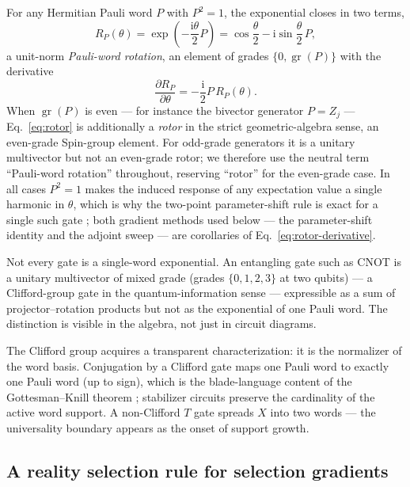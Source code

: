\documentclass[11pt]{article}
\newcommand{\ii}{\mathrm{i}}
\begin{document}
For any Hermitian Pauli word $P$ with $P^2=1$, the exponential closes in two terms,
\begin{equation}
    R_P(\theta)=\exp\!\left(-\frac{\ii\theta}{2}P\right)
    =\cos\frac{\theta}{2}-\ii\sin\frac{\theta}{2}\,P,
    \label{eq:rotor}
\end{equation}
a unit-norm \emph{Pauli-word rotation}, an element of grades $\{0,\operatorname{gr}(P)\}$ with the derivative
\begin{equation}
    \frac{\partial R_P}{\partial\theta}= -\frac{\ii}{2}P\, R_P(\theta).
    \label{eq:rotor-derivative}
\end{equation}
When $\operatorname{gr}(P)$ is even --- for instance the bivector generator $P=Z_j$ --- Eq.~\eqref{eq:rotor} is additionally a \emph{rotor} in the strict geometric-algebra sense, an even-grade Spin-group element.  For odd-grade generators it is a unitary multivector but not an even-grade rotor; we therefore use the neutral term ``Pauli-word rotation'' throughout, reserving ``rotor'' for the even-grade case.  In all cases $P^2=1$ makes the induced response of any expectation value a single harmonic in $\theta$, which is why the two-point parameter-shift rule is exact for a single such gate \cite{mitarai2018qcl,wierichs2022general}; both gradient methods used below --- the parameter-shift identity and the adjoint sweep --- are corollaries of Eq.~\eqref{eq:rotor-derivative}.

Not every gate is a single-word exponential.  An entangling gate such as CNOT is a unitary multivector of mixed grade (grades $\{0,1,2,3\}$ at two qubits) --- a Clifford-group gate in the quantum-information sense --- expressible as a sum of projector--rotation products but not as the exponential of one Pauli word.  The distinction is visible in the algebra, not just in circuit diagrams.

The Clifford group acquires a transparent characterization: it is the normalizer of the word basis.  Conjugation by a Clifford gate maps one Pauli word to exactly one Pauli word (up to sign), which is the blade-language content of the Gottesman--Knill theorem \cite{aaronson2004stabilizer}; stabilizer circuits preserve the cardinality of the active word support.  A non-Clifford $T$ gate spreads $X$ into two words --- the universality boundary appears as the onset of support growth.

\subsection{A reality selection rule for selection gradients}
\label{sec:parity}
\end{document}
